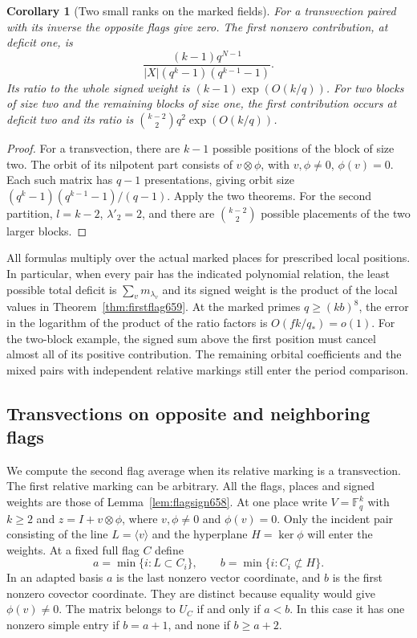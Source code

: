 \documentclass[a4paper,11pt]{article}
\newtheorem{corollary}[proposition]{Corollary}
\theoremstyle{definition}
\theoremstyle{remark}
\numberwithin{equation}{section}
\begin{document}
\begin{corollary}[Two small ranks on the marked fields]
\leavevmode\label{cor:smalljordan659}
For a transvection paired with its inverse the opposite flags
give zero. The first nonzero contribution, at deficit one, is
\[
       \frac{(k-1)q^{N-1}}
       {|X|(q^k-1)(q^{k-1}-1)} .
\]
Its ratio to the whole signed weight is
\((k-1)\exp(O(k/q))\). For two blocks of size two and the
remaining blocks of size one, the first contribution occurs at
deficit two and its ratio is \(\binom{k-2}{2}q^2\exp(O(k/q))\).
\end{corollary}
\begin{proof}
For a transvection, there are \(k-1\) possible positions of
the block of size two. The orbit of its nilpotent part consists
of \(v\otimes\phi\), with \(v,\phi\ne0\), \(\phi(v)=0\).
Each such matrix has \(q-1\) presentations, giving orbit size
\((q^k-1)(q^{k-1}-1)/(q-1)\). Apply the two theorems. For the
second partition, \(l=k-2\), \(\lambda'_2=2\), and there are
\(\binom{k-2}{2}\) possible placements of the two larger blocks.
\end{proof}

All formulas multiply over the actual marked places for prescribed
local positions. In particular, when every pair has the indicated
polynomial relation, the least possible total deficit is
\(\sum_v m_{\lambda_v}\) and its signed weight is the product
of the local values in Theorem~\ref{thm:firstflag659}.
At the marked primes \(q\ge(kb)^8\), the error in the logarithm
of the product of the ratio factors is \(O(fk/q_*)=o(1)\).
For the two-block example, the signed sum above the first
position must cancel almost all of its positive contribution.
The remaining orbital coefficients and the mixed pairs with
independent relative markings still enter the period comparison.


\subsection{Transvections on opposite and neighboring flags}
\label{sec:oppositetrans660}

We compute the second flag average when its relative marking
is a transvection. The first relative marking can be arbitrary.
All the flags, places and signed weights are those of
Lemma~\ref{lem:flagsign658}. At one place write \(V=\mathbb F_q^k\)
with \(k\ge2\) and \(z=I+v\otimes\phi\), where \(v,\phi\ne0\)
and \(\phi(v)=0\). Only the incident pair consisting of the
line \(L=\langle v\rangle\) and the hyperplane \(H=\ker\phi\)
will enter the weights. At a fixed full flag \(C\) define
\[
        a=\min\{i:L\subset C_i\},\qquad
        b=\min\{i:C_i\not\subset H\}.
\]
In an adapted basis \(a\) is the last nonzero vector coordinate,
and \(b\) is the first nonzero covector coordinate. They are
distinct because equality would give \(\phi(v)\ne0\).
The matrix belongs to \(U_C\) if and only if \(a<b\).
In this case it has one nonzero simple entry if \(b=a+1\),
and none if \(b\ge a+2\).
\end{document}

